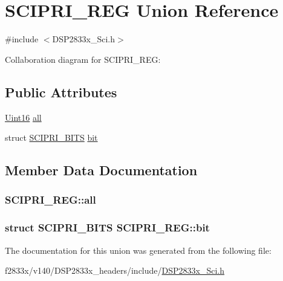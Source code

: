 \hypertarget{union_s_c_i_p_r_i___r_e_g}{}\section{S\+C\+I\+P\+R\+I\+\_\+\+R\+E\+G Union Reference}
\label{union_s_c_i_p_r_i___r_e_g}


{\ttfamily \#include $<$D\+S\+P2833x\+\_\+\+Sci.\+h$>$}



Collaboration diagram for S\+C\+I\+P\+R\+I\+\_\+\+R\+E\+G\+:
\subsection*{Public Attributes}
\begin{DoxyCompactItemize}
\item 
\hyperlink{_d_s_p2833x___device_8h_a59a9f6be4562c327cbfb4f7e8e18f08b}{Uint16} \hyperlink{union_s_c_i_p_r_i___r_e_g_ae92693e512779682a5c9ce21ca033d06}{all}
\item 
struct \hyperlink{struct_s_c_i_p_r_i___b_i_t_s}{S\+C\+I\+P\+R\+I\+\_\+\+B\+I\+T\+S} \hyperlink{union_s_c_i_p_r_i___r_e_g_abf08bad99c6da8059f652b7fbe8063e4}{bit}
\end{DoxyCompactItemize}


\subsection{Member Data Documentation}
\hypertarget{union_s_c_i_p_r_i___r_e_g_ae92693e512779682a5c9ce21ca033d06}{}
\subsubsection[{all}]{ S\+C\+I\+P\+R\+I\+\_\+\+R\+E\+G\+::all}\label{union_s_c_i_p_r_i___r_e_g_ae92693e512779682a5c9ce21ca033d06}
\hypertarget{union_s_c_i_p_r_i___r_e_g_abf08bad99c6da8059f652b7fbe8063e4}{}
\subsubsection[{bit}]{\setlength{\rightskip}{0pt plus 5cm}struct {\bf S\+C\+I\+P\+R\+I\+\_\+\+B\+I\+T\+S} S\+C\+I\+P\+R\+I\+\_\+\+R\+E\+G\+::bit}\label{union_s_c_i_p_r_i___r_e_g_abf08bad99c6da8059f652b7fbe8063e4}


The documentation for this union was generated from the following file\+:\begin{DoxyCompactItemize}
\item 
f2833x/v140/\+D\+S\+P2833x\+\_\+headers/include/\hyperlink{_d_s_p2833x___sci_8h}{D\+S\+P2833x\+\_\+\+Sci.\+h}\end{DoxyCompactItemize}
